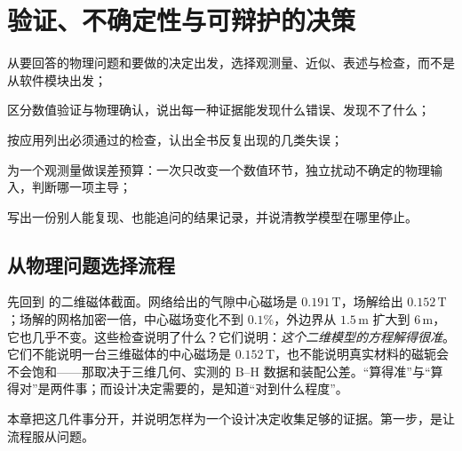 \chapter{验证、不确定性与可辩护的决策}\label{ch:practice}

\begin{chapterguide}
\begin{guidegoals}
\item 从要回答的物理问题和要做的决定出发，选择观测量、近似、表述与检查，而不是从软件模块出发；
\item 区分数值验证与物理确认，说出每一种证据能发现什么错误、发现不了什么；
\item 按应用列出必须通过的检查，认出全书反复出现的几类失误；
\item 为一个观测量做误差预算：一次只改变一个数值环节，独立扰动不确定的物理输入，判断哪一项主导；
\item 写出一份别人能复现、也能追问的结果记录，并说清教学模型在哪里停止。
\end{guidegoals}
\end{chapterguide}

\section{从物理问题选择流程}\label{sec:practice-workflow}

先回到 的二维磁体截面。网络给出的气隙中心磁场是 $0.191\,\mathrm T$，场解给出 $0.152\,\mathrm T$；场解的网格加密一倍，中心磁场变化不到 $0.1\%$，外边界从 $1.5\,\mathrm m$ 扩大到 $6\,\mathrm m$，它也几乎不变。这些检查说明了什么？它们说明：\emph{这个二维模型的方程解得很准}。它们不能说明一台三维磁体的中心磁场是 $0.152\,\mathrm T$，也不能说明真实材料的磁轭会不会饱和——那取决于三维几何、实测的 B--H 数据和装配公差。“算得准”与“算得对”是两件事；而设计决定需要的，是知道“对到什么程度”。

本章把这几件事分开，并说明怎样为一个设计决定收集足够的证据。第一步，是让流程服从问题。

